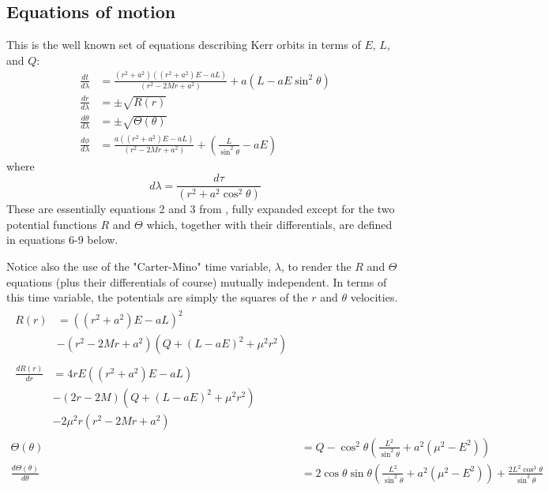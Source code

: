 \documentclass[11pt]{article}
\begin{document}
\subsection {Equations of motion}

This is the well known set of equations describing Kerr orbits in terms of $E$, $L$, and $Q$:
\begin{align}
\frac{d t}{d \lambda} &= \frac{(r^2 + a^2) \left((r^2 + a^2) E - aL \right)} {(r^2 - 2Mr  + a^2)} + a(L - aE \sin^2 \theta) \\
\frac{d r}{d \lambda} &= \pm \sqrt {R(r)} \\
\frac{d \theta}{d \lambda} &= \pm \sqrt {\Theta (\theta)} \\
\frac{d \phi}{d \lambda} &= \frac{a \left((r^2 + a^2) E - aL \right)} {(r^2 - 2Mr  + a^2)} + \left(\frac {L} {\sin^2 \theta} -aE \right)
\end{align}
where
\begin{equation}
d \lambda = \frac {d \tau} {(r^2 + a^2 \cos^2\theta)}
\end{equation}
These are essentially equations 2 and 3 from \cite{wilkins}, fully expanded except for the two potential functions $R$ and $\Theta$ which, together with their differentials, are defined in equations 6-9 below.

Notice also the use of the "Carter-Mino" time variable, $\lambda$, to render the $R$ and $\Theta$ equations (plus their differentials of course) mutually independent.  In terms of this time variable, the potentials are simply the squares of the $r$ and $\theta$ velocities.
\begin{align}
   \begin{split}
    R(r) &= \left((r^2 + a^2) E - aL \right)^2 \label{eq:2}\\
    &- (r^2 - 2Mr  + a^2) \left(Q + ( L - aE)^2 + \mu^2 r^2 \right)
   \end{split}\\
   \begin{split}
    \frac{d R(r)}{d r} &= 4rE \left((r^2 + a^2)E - aL \right) \label{eq:2}\\
    &- (2r - 2M) \left(Q + ( L - aE)^2 + \mu^2 r^2 \right)\\
    &- 2\mu^2r(r^2 - 2Mr  + a^2)
   \end{split}\\
  \Theta (\theta) &= Q - {\cos^2 \theta } \left( \frac{L^2}{\sin^2 \theta } + a^2( \mu^2 - E^2) \right) \label{eq:3}\\
  \frac{d \Theta (\theta)}{d \theta} &= 2 \cos \theta \sin \theta \left(\frac{L^2} {\sin^2 \theta } + a^2(\mu^2 - E^2) \right) +\frac{2 L^2 \cos^3 \theta } {\sin^3 \theta } \label{eq:4}
\end{align}
\end{document}

